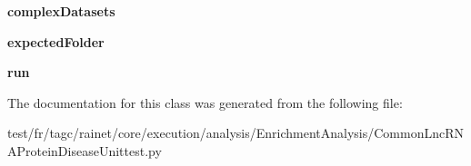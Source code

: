 \begin{DoxyCompactItemize}
\item 
\hypertarget{classCommonLncRNAProteinDiseaseUnittest_1_1CommonLncRNAProteinDiseaseUnittest_a6cdb4beaf2a54a29aba5656d55a41a27}{{\bfseries complex\-Datasets}}\label{classCommonLncRNAProteinDiseaseUnittest_1_1CommonLncRNAProteinDiseaseUnittest_a6cdb4beaf2a54a29aba5656d55a41a27}

\item 
\hypertarget{classCommonLncRNAProteinDiseaseUnittest_1_1CommonLncRNAProteinDiseaseUnittest_a654f59c6ee381e479d556a0b75ca71b0}{{\bfseries expected\-Folder}}\label{classCommonLncRNAProteinDiseaseUnittest_1_1CommonLncRNAProteinDiseaseUnittest_a654f59c6ee381e479d556a0b75ca71b0}

\item 
\hypertarget{classCommonLncRNAProteinDiseaseUnittest_1_1CommonLncRNAProteinDiseaseUnittest_a9bbdca0e6e0ecf24392db99078a4b53b}{{\bfseries run}}\label{classCommonLncRNAProteinDiseaseUnittest_1_1CommonLncRNAProteinDiseaseUnittest_a9bbdca0e6e0ecf24392db99078a4b53b}

\end{DoxyCompactItemize}


The documentation for this class was generated from the following file\-:\begin{DoxyCompactItemize}
\item 
test/fr/tagc/rainet/core/execution/analysis/\-Enrichment\-Analysis/Common\-Lnc\-R\-N\-A\-Protein\-Disease\-Unittest.\-py\end{DoxyCompactItemize}
